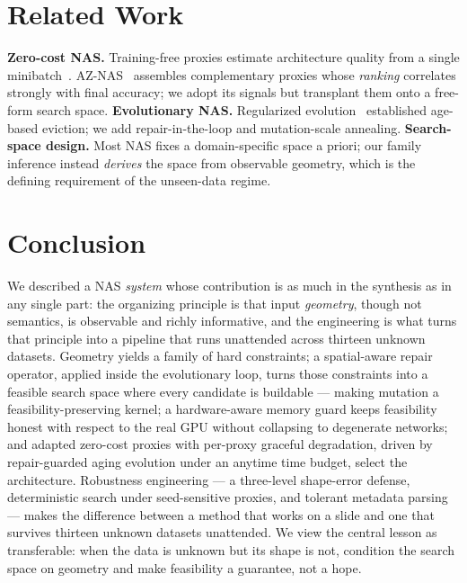 \documentclass[10pt,twocolumn]{article}
\begin{document}
\section{Related Work}

\textbf{Zero-cost NAS.} Training-free proxies estimate architecture quality
from a single minibatch~\cite{naswot,zerocost}. AZ-NAS~\cite{aznas2024}
assembles complementary proxies whose \emph{ranking} correlates strongly with
final accuracy; we adopt its signals but transplant them onto a free-form
search space. \textbf{Evolutionary NAS.} Regularized evolution~\cite{regevo2019}
established age-based eviction; we add repair-in-the-loop and mutation-scale
annealing. \textbf{Search-space design.} Most NAS fixes a domain-specific space
a priori; our family inference instead \emph{derives} the space from observable
geometry, which is the defining requirement of the unseen-data regime.

\section{Conclusion}

We described a NAS \emph{system} whose contribution is as much in the synthesis
as in any single part: the organizing principle is that input \emph{geometry},
though not semantics, is observable and richly informative, and the engineering
is what turns that principle into a pipeline that runs unattended across
thirteen unknown datasets. Geometry yields a family of hard constraints; a
spatial-aware repair operator, applied inside the evolutionary loop, turns those
constraints into a feasible search space where every candidate is buildable ---
making mutation a feasibility-preserving kernel; a hardware-aware memory guard
keeps feasibility honest with respect to the real GPU without collapsing to
degenerate networks; and adapted zero-cost proxies with per-proxy graceful
degradation, driven by repair-guarded aging evolution under an anytime time
budget, select the architecture. Robustness engineering --- a three-level
shape-error defense, deterministic search under seed-sensitive proxies, and
tolerant metadata parsing --- makes the difference between a method that works
on a slide and one that survives thirteen unknown datasets unattended. We view
the central lesson as transferable: when the data is unknown but its shape is
not, condition the search space on geometry and make feasibility a guarantee,
not a hope.
\end{document}
